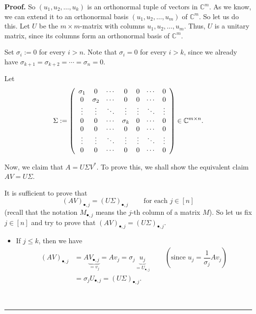 \documentclass[numbers=enddot,12pt,final,onecolumn,notitlepage]{scrartcl}%
\numberwithin{exer}{subsection}
\theoremstyle{definition}
\newenvironment{proof}[1][Proof]{\noindent\textbf{#1.} }{\ \rule{0.5em}{0.5em}}
\begin{document}
\begin{proof}
So $\left(  u_{1},u_{2},\ldots,u_{k}\right)  $ is an orthonormal tuple of
vectors in $\mathbb{C}^{m}$. As we know, we can extend it to an orthonormal
basis $\left(  u_{1},u_{2},\ldots,u_{m}\right)  $ of $\mathbb{C}^{m}$. So let
us do this. Let $U$ be the $m\times m$-matrix with columns $u_{1},u_{2}%
,\ldots,u_{m}$. Thus, $U$ is a unitary matrix, since its columns form an
orthonormal basis of $\mathbb{C}^{m}$.

Set $\sigma_{i}:=0$ for every $i>n$. Note that $\sigma_{i}=0$ for every $i>k$,
since we already have $\sigma_{k+1}=\sigma_{k+2}=\cdots=\sigma_{n}=0$.

Let%
\[
\Sigma:=\left(
\begin{array}
[c]{ccccccc}%
\sigma_{1} & 0 & \cdots & 0 & 0 & \cdots & 0\\
0 & \sigma_{2} & \cdots & 0 & 0 & \cdots & 0\\
\vdots & \vdots & \ddots & \vdots & \vdots & \ddots & \vdots\\
0 & 0 & \cdots & \sigma_{k} & 0 & \cdots & 0\\
0 & 0 & \cdots & 0 & 0 & \cdots & 0\\
\vdots & \vdots & \ddots & \vdots & \vdots & \ddots & \vdots\\
0 & 0 & \cdots & 0 & 0 & \cdots & 0
\end{array}
\right)  \in\mathbb{C}^{m\times n}.
\]


Now, we claim that $A=U\Sigma V^{\ast}$. To prove this, we shall show the
equivalent claim $AV=U\Sigma$.

It is sufficient to prove that
\[
\left(  AV\right)  _{\bullet,j}=\left(  U\Sigma\right)  _{\bullet
,j}\ \ \ \ \ \ \ \ \ \ \text{for each }j\in\left[  n\right]
\]
(recall that the notation $M_{\bullet,j}$ means the $j$-th column of a matrix
$M$). So let us fix $j\in\left[  n\right]  $ and try to prove that $\left(
AV\right)  _{\bullet,j}=\left(  U\Sigma\right)  _{\bullet,j}$.

\begin{itemize}
\item If $j\leq k$, then we have%
\begin{align*}
\left(  AV\right)  _{\bullet,j}  &  =A\underbrace{V_{\bullet,j}}_{=v_{j}%
}=Av_{j}=\sigma_{j}\underbrace{u_{j}}_{=U_{\bullet,j}}%
\ \ \ \ \ \ \ \ \ \ \left(  \text{since }u_{j}=\dfrac{1}{\sigma_{j}}%
Av_{j}\right) \\
&  =\sigma_{j}U_{\bullet,j}=\left(  U\Sigma\right)  _{\bullet,j}.
\end{align*}



\end{itemize}
\end{proof}
\end{document}
